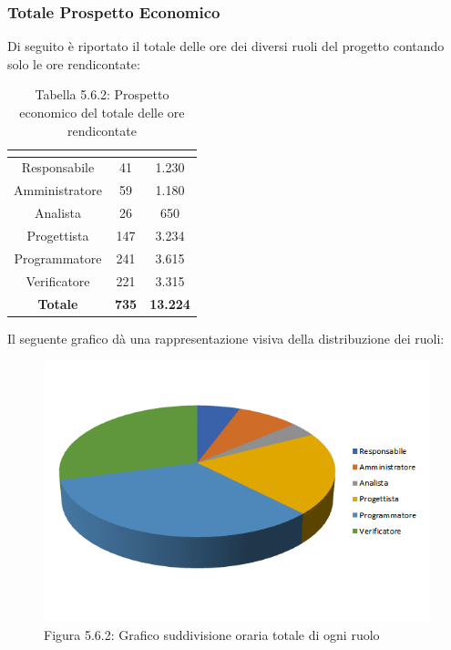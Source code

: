 \subsubsection{Totale Prospetto Economico}
Di seguito è riportato il totale delle ore dei diversi ruoli del progetto contando solo le ore rendicontate:

\renewcommand{\arraystretch}{1.5}
\begin{table}[H]
\begin{center}
\begin{tabular}{|c|c|c|}
\hline
\rowcolor{title_row}
\textbf{\color{title_text}{Ruolo}}  & \textbf{\color{title_text}{Ore}} & \textbf{\color{title_text}{Costo in \euro}} \\ \hline
Responsabile    & 41 & 1.230  \\ \hline
Amministratore  & 59 & 1.180 \\ \hline
Analista        & 26 & 650 \\ \hline
Progettista     & 147 & 3.234 \\ \hline
Programmatore   & 241 & 3.615 \\ \hline
Verificatore    & 221 & 3.315 \\ \hline
\textbf{Totale} & \textbf{735}    & \textbf{13.224}           \\ \hline
\end{tabular}
\caption{Tabella 5.6.2: Prospetto economico del totale delle ore rendicontate\label{}}
\end{center}
\end{table}
\renewcommand{\arraystretch}{1}

Il seguente grafico dà una rappresentazione visiva della distribuzione dei ruoli: \\
\begin{figure} [H]
	\centering
	\includegraphics[scale=1]{Res/ExcelGrafici/Grafici/TotaleRuoli.png}
	\caption{Figura 5.6.2: Grafico suddivisione oraria totale di ogni ruolo}\label{}
\end{figure}


\pagebreak
